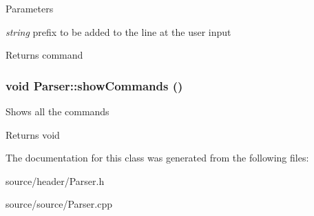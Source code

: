 \begin{DoxyParams}{Parameters}
\item[{\em string}]prefix to be added to the line at the user input\end{DoxyParams}
\begin{DoxyReturn}{Returns}
command 
\end{DoxyReturn}
\hypertarget{classParser_ab893322079a7bc6e6b2153da7d9468bd}{
\subsubsection[{showCommands}]{\setlength{\rightskip}{0pt plus 5cm}void Parser::showCommands ()}}
\label{d0/d40/classParser_ab893322079a7bc6e6b2153da7d9468bd}
Shows all the commands

\begin{DoxyReturn}{Returns}
void 
\end{DoxyReturn}


The documentation for this class was generated from the following files:\begin{DoxyCompactItemize}
\item 
source/header/Parser.h\item 
source/source/Parser.cpp\end{DoxyCompactItemize}
